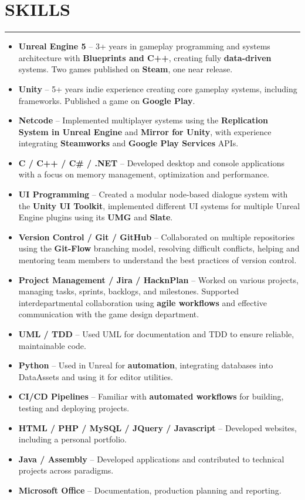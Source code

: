 \documentclass[7pt]{article}
\newcommand{\sectionline}{\vspace{-0.3em}\noindent\rule{\linewidth}{0.15pt}\vspace{0.08em}}
\newcommand{\cvsection}[2]{%
    \vspace{-.6em}
    \section*{{\large\textbf{\MakeUppercase{#1}}}}
    \vspace{-0.5em}
    \sectionline
    \vspace{-0.15em}
    #2
}
\begin{document}
    \cvsection{SKILLS}{
        \begin{itemize}[noitemsep, topsep=0pt, parsep=0pt, partopsep=0pt, itemsep=0pt, leftmargin=*]
            \item \textbf{Unreal Engine 5} – 3+ years in gameplay programming and systems architecture with \textbf{Blueprints and C++}, creating fully \textbf{data-driven} systems. Two games published on \textbf{Steam}, one near release.
            \item \textbf{Unity} – 5+ years indie experience creating core gameplay systems, including frameworks. Published a game on \textbf{Google Play}.
            \item \textbf{Netcode} – Implemented multiplayer systems using the \textbf{Replication System in Unreal Engine} and \textbf{Mirror for Unity}, with experience integrating \textbf{Steamworks} and \textbf{Google Play Services} APIs.
            \item \textbf{C / C++ / C\# / .NET} – Developed desktop and console applications with a focus on memory management, optimization and performance.
            \item \textbf{UI Programming} – Created a modular node-based dialogue system with the \textbf{Unity UI Toolkit}, implemented different UI systems for multiple Unreal Engine plugins using its \textbf{UMG} and \textbf{Slate}.
            \item \textbf{Version Control / Git / GitHub} – Collaborated on multiple repositories using the \textbf{Git-Flow} branching model, resolving difficult conflicts, helping and mentoring team members to understand the best practices of version control.
            \item \textbf{Project Management / Jira / HacknPlan} – Worked on various projects, managing tasks, sprints, backlogs, and milestones. Supported interdepartmental collaboration using \textbf{agile workflows} and effective communication with the game design department.
            \item \textbf{UML / TDD} – Used UML for documentation and TDD to ensure reliable, maintainable code.
            \item \textbf{Python} – Used in Unreal for \textbf{automation}, integrating databases into DataAssets and using it for editor utilities.
            \item \textbf{CI/CD Pipelines} – Familiar with \textbf{automated workflows} for building, testing and deploying projects.
            \item \textbf{HTML / PHP / MySQL / JQuery / Javascript} – Developed websites, including a personal portfolio.
            \item \textbf{Java / Assembly} – Developed applications and contributed to technical projects across paradigms.
            \item \textbf{Microsoft Office} – Documentation, production planning and reporting.
        \end{itemize}
    }
\end{document}
